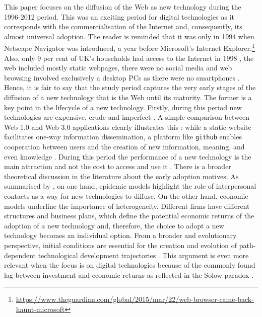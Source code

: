 \documentclass[
  authoryear,
  preprint,
  3p]{elsarticle}
\begin{document}
This paper focuses on the diffusion of the Web as new technology during
the 1996-2012 period. This was an exciting period for digital
technologies as it corresponds with the commercialisation of the
Internet and, consequently, its almost universal adoption. The reader is
reminded that it was only in 1994 when Netscape Navigator was
introduced, a year before Microsoft's Internet Explorer.\footnote{\url{https://www.theguardian.com/global/2015/mar/22/web-browser-came-back-haunt-microsoft}}
Also, only 9 per cent of UK's households had access to the Internet in
1998 \citep{ons2018}, the web included mostly static webpages, there
were no social media and web browsing involved exclusively a desktop PCs
as there were no smartphones \citep{tranosuk}. Hence, it is fair to say
that the study period captures the very early stages of the diffusion of
a new technology that is the Web until its maturity. The former is a key
point in the lifecycle of a new technology. Firstly, during this period
new technologies are expensive, crude and imperfect
\citep{rosenberg1994exploring, wilson201281}. A simple comparison
between Web 1.0 and Web 3.0 applications clearly illustrates this
\citep{tranos2020social}: while a static website facilitates one-way
information dissemination, a platform like \texttt{github} enables
cooperation between users and the creation of new information, meaning,
and even knowledge \citep{faraj2016special, barassi2012does}. During
this period the performance of a new technology is the main attraction
and not the cost to access and use it \citep{wilson2011lessons}. There
is a broader theoretical discussion in the literature about the early
adoption motives. As summarised by \citet{perkins2005international}, on
one hand, epidemic models highlight the role of interpersonal contacts
as a way for new technologies to diffuse. On the other hand, economic
models underline the importance of heterogeneity. Different firms have
different structures and business plans, which define the potential
economic returns of the adoption of a new technology and, therefore, the
choice to adopt a new technology becomes an individual option. From a
broader and evolutionary perspective, initial conditions are essential
for the creation and evolution of path-dependent technological
development trajectories \citep{neffke2011regions, simmie2014new}. This
argument is even more relevant when the focus is on digital technologies
because of the commonly found lag between investment and economic
returns as reflected in the Solow paradox
\citep{acemoglu2014return, brynjolfsson2018artificial}.
\end{document}
